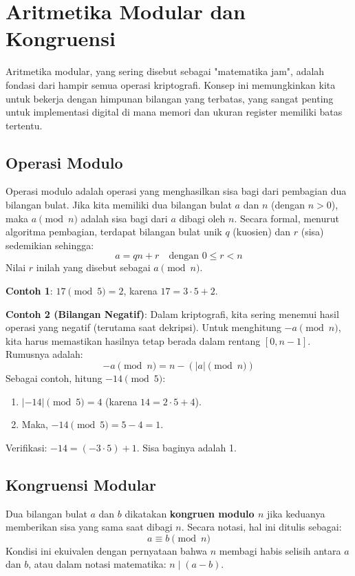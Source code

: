 \section{Aritmetika Modular dan Kongruensi}

Aritmetika modular, yang sering disebut sebagai "matematika jam", adalah fondasi dari hampir semua operasi kriptografi. Konsep ini memungkinkan kita untuk bekerja dengan himpunan bilangan yang terbatas, yang sangat penting untuk implementasi digital di mana memori dan ukuran register memiliki batas tertentu.

\subsection{Operasi Modulo}

Operasi modulo adalah operasi yang menghasilkan sisa bagi dari pembagian dua bilangan bulat. Jika kita memiliki dua bilangan bulat $a$ dan $n$ (dengan $n > 0$), maka $a \pmod{n}$ adalah sisa bagi dari $a$ dibagi oleh $n$. Secara formal, menurut algoritma pembagian, terdapat bilangan bulat unik $q$ (kuosien) dan $r$ (sisa) sedemikian sehingga:
\[ a = qn + r \quad \text{dengan } 0 \le r < n \]
Nilai $r$ inilah yang disebut sebagai $a \pmod{n}$.

\textbf{Contoh 1}:
$17 \pmod{5} = 2$, karena $17 = 3 \cdot 5 + 2$.

\textbf{Contoh 2 (Bilangan Negatif)}:
Dalam kriptografi, kita sering menemui hasil operasi yang negatif (terutama saat dekripsi). Untuk menghitung $-a \pmod{n}$, kita harus memastikan hasilnya tetap berada dalam rentang $[0, n-1]$. Rumusnya adalah:
\[ -a \pmod{n} = n - (|a| \pmod{n}) \]
Sebagai contoh, hitung $-14 \pmod{5}$:
\begin{enumerate}
    \item $|-14| \pmod{5} = 4$ (karena $14 = 2 \cdot 5 + 4$).
    \item Maka, $-14 \pmod{5} = 5 - 4 = 1$.
\end{enumerate}
Verifikasi: $-14 = (-3 \cdot 5) + 1$. Sisa baginya adalah 1.

\subsection{Kongruensi Modular}

Dua bilangan bulat $a$ dan $b$ dikatakan \textbf{kongruen modulo $n$} jika keduanya memberikan sisa yang sama saat dibagi $n$. Secara notasi, hal ini ditulis sebagai:
\[ a \equiv b \pmod{n} \]
Kondisi ini ekuivalen dengan pernyataan bahwa $n$ membagi habis selisih antara $a$ dan $b$, atau dalam notasi matematika: $n \mid (a - b)$.

